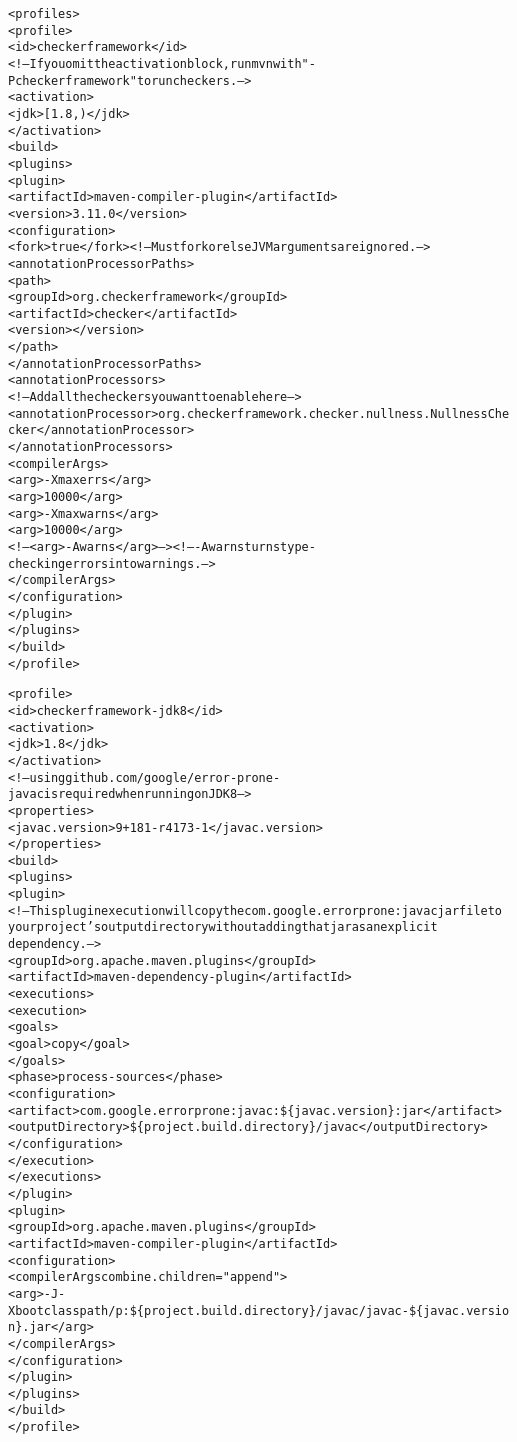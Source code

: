 \begin{enumerate}
\begin{mysmall}
\begin{alltt}
  <profiles>
    <profile>
      <id>checkerframework</id>
      <!-- If you omit the activation block, run mvn with "-P checkerframework" to run checkers. -->
      <activation>
        <jdk>[1.8,)</jdk>
      </activation>
      <build>
        <plugins>
          <plugin>
            <artifactId>maven-compiler-plugin</artifactId>
            <version>3.11.0</version>
            <configuration>
              <fork>true</fork> <!-- Must fork or else JVM arguments are ignored. -->
              <annotationProcessorPaths>
                <path>
                  <groupId>org.checkerframework</groupId>
                  <artifactId>checker</artifactId>
                  <version>\ReleaseVersion{}</version>
                </path>
              </annotationProcessorPaths>
              <annotationProcessors>
                <!-- Add all the checkers you want to enable here -->
                <annotationProcessor>org.checkerframework.checker.nullness.NullnessChecker</annotationProcessor>
              </annotationProcessors>
              <compilerArgs>
                <arg>-Xmaxerrs</arg>
                <arg>10000</arg>
                <arg>-Xmaxwarns</arg>
                <arg>10000</arg>
                <!-- <arg>-Awarns</arg> --> <!-- -Awarns turns type-checking errors into warnings. -->
              </compilerArgs>
            </configuration>
          </plugin>
        </plugins>
      </build>
    </profile>

    <profile>
      <id>checkerframework-jdk8</id>
      <activation>
        <jdk>1.8</jdk>
      </activation>
      <!-- using github.com/google/error-prone-javac is required when running on JDK 8 -->
      <properties>
        <javac.version>9+181-r4173-1</javac.version>
      </properties>
      <build>
        <plugins>
          <plugin>
            <!-- This plugin execution will copy the com.google.errorprone:javac jar file to
                 your project's output directory without adding that jar as an explicit
                 dependency. -->
            <groupId>org.apache.maven.plugins</groupId>
            <artifactId>maven-dependency-plugin</artifactId>
            <executions>
              <execution>
                <goals>
                  <goal>copy</goal>
                </goals>
                <phase>process-sources</phase>
                <configuration>
                  <artifact>com.google.errorprone:javac:\$\{javac.version\}:jar</artifact>
                  <outputDirectory>\$\{project.build.directory\}/javac</outputDirectory>
                </configuration>
              </execution>
            </executions>
          </plugin>
          <plugin>
            <groupId>org.apache.maven.plugins</groupId>
            <artifactId>maven-compiler-plugin</artifactId>
            <configuration>
              <compilerArgs combine.children="append">
                <arg>-J-Xbootclasspath/p:\$\{project.build.directory\}/javac/javac-\$\{javac.version\}.jar</arg>
              </compilerArgs>
            </configuration>
          </plugin>
        </plugins>
      </build>
    </profile>


\end{alltt}
\end{mysmall}
\end{enumerate}
